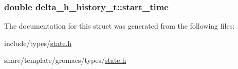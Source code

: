\hypertarget{structdelta__h__history__t_afc228f841ee0fdf94bb91c9835012e32}{
\subsubsection[{start\-\_\-time}]{\setlength{\rightskip}{0pt plus 5cm}double {\bf delta\-\_\-h\-\_\-history\-\_\-t\-::start\-\_\-time}}}\label{structdelta__h__history__t_afc228f841ee0fdf94bb91c9835012e32}


\-The documentation for this struct was generated from the following files\-:\begin{DoxyCompactItemize}
\item 
include/types/\hyperlink{include_2types_2state_8h}{state.\-h}\item 
share/template/gromacs/types/\hyperlink{share_2template_2gromacs_2types_2state_8h}{state.\-h}\end{DoxyCompactItemize}
